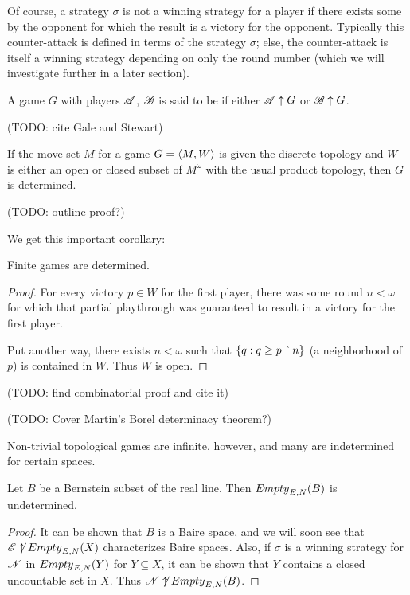 Of course, a strategy $\sigma$ is not a winning strategy for a player if there 
exists some  by the opponent for which the result is 
a victory for the opponent. Typically this counter-attack is defined in
terms of the strategy $\sigma$; else, the counter-attack is itself a
winning strategy depending on only the round number (which we will
investigate further in a later section).

\begin{defn}
  A game $G$ with players $\mathscr{A}$, $\mathscr{B}$ is said to be 
  if either $\mathscr{A} \uparrow G$ or $\mathscr{B} \uparrow G$.
\end{defn}

(TODO: cite Gale and Stewart)

\begin{thm}
  If the move set $M$ for a game $G=\langle M,W\rangle$ is given the discrete topology
  and $W$ is either an open or closed subset of $M^\omega$ with the
  usual product topology, then $G$ is determined.
\end{thm}

(TODO: outline proof?)

We get this important corollary:

\begin{cor}
  Finite games are determined.
\end{cor}

\begin{proof} 
  For every victory $p\in W$ for the first player, there was some 
  round $n<\omega$ for which that partial playthrough was guaranteed to
  result in a victory for the first player. 

  Put another way, there exists $n<\omega$ such that
    $ 
      \{q : q\geq p\restriction n \}
    $
  (a neighborhood of $p$) is contained in $W$. Thus $W$ is open.
\end{proof}

(TODO: find combinatorial proof and cite it)

(TODO: Cover Martin's Borel determinacy theorem?)

Non-trivial topological games are infinite, however, and many are indetermined
for certain spaces.

\begin{ex}
  Let $B$ be a Bernstein subset of the real line. Then ${Empty}_{E,N}(B)$ is
  undetermined.
\end{ex}

\begin{proof}
  It can be shown that $B$ is a Baire space, and we will soon see that 
  $\mathscr{E}\not\uparrow {Empty}_{E,N}(X)$ characterizes Baire spaces. Also, if $\sigma$
  is a winning strategy for $\mathscr{N}$ in ${Empty}_{E,N}(Y)$ for $Y\subseteq X$, it can 
  be shown that $Y$ contains a closed uncountable set in $X$. 
  Thus $\mathscr{N}\not\uparrow {Empty}_{E,N}(B)$.
\end{proof}

